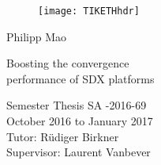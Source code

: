   \begin{titlepage}

  \begin{center}
  \begin{figure}[!t]
     \texttt{[image: TIKETHhdr]}
  \end{figure}
  \end{center}

  \vspace{2 cm}

  {\large Philipp Mao}
  \vspace{2 cm}

  {\Huge Boosting the convergence \\ performance of SDX platforms}\\

  \vspace{\fill}


  Semester Thesis SA -2016-69\\
  October 2016 to January 2017\\

  \vspace{1cm}
  Tutor: Rüdiger Birkner \\
  Supervisor: Laurent Vanbever \\
    
  \end{titlepage}
